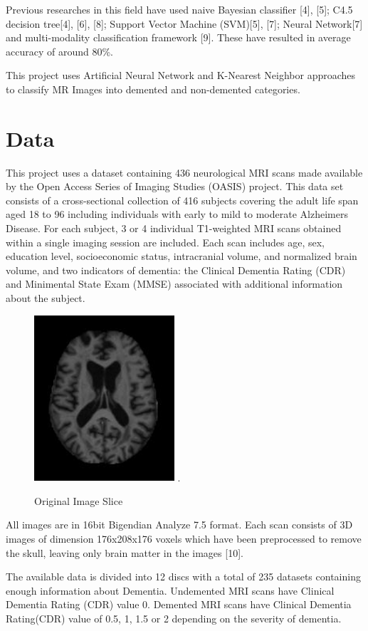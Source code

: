 \documentclass[journal,twoside]{IEEEtran}
\begin{document}
\par Previous researches in this field have used naive Bayesian classifier [4], [5]; C4.5 decision tree[4], [6], [8]; Support Vector Machine (SVM)[5], [7]; Neural Network[7] and multi-modality classification framework [9]. These have resulted in average accuracy of around 80\%. 
\par This project uses Artificial Neural Network and K-Nearest Neighbor approaches to classify MR Images into demented and non-demented categories.
\section{Data}
This project uses a dataset containing 436 neurological MRI scans made available by the Open Access Series of Imaging Studies (OASIS) project. This data set consists of a cross-sectional collection of 416 subjects covering the adult life span aged 18 to 96 including individuals with early to mild to moderate Alzheimer\textquotesingle s Disease. For each subject, 3 or 4 individual T1-weighted MRI scans obtained within a single imaging session are included. Each scan includes age, sex, education level, socioeconomic status, intracranial volume, and normalized brain volume, and two indicators of dementia: the Clinical Dementia Rating (CDR) and Minimental State Exam (MMSE) associated with additional information about the subject. 
\begin{figure}[h!]
\centering
\includegraphics[width=2.05in]{5.jpg}
\DeclareGraphicsExtensions.
\caption{Original Image Slice}
\end{figure}
\par All images are in 16bit Bigendian Analyze 7.5 format. Each scan consists of 3D images of dimension 176x208x176 voxels which have been preprocessed to remove the skull, leaving only brain matter in the images [10]. 
\par The available data is divided into 12 discs with a total of 235 datasets containing enough information about Dementia. Undemented MRI scans have Clinical Dementia Rating (CDR) value 0. Demented MRI scans have Clinical Dementia Rating(CDR) value of 0.5, 1, 1.5 or 2 depending on the severity of dementia.
\end{document}
